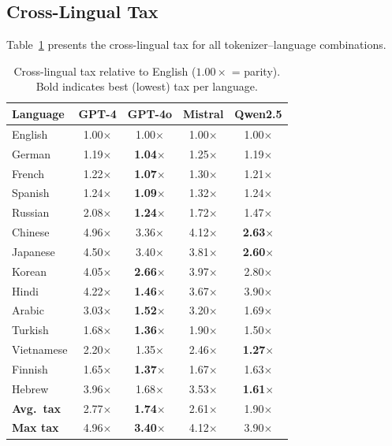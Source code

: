 \documentclass[11pt]{article}
\begin{document}
\subsection{Cross-Lingual Tax}

Table~\ref{tab:tax} presents the cross-lingual tax for all tokenizer--language combinations.

\begin{table}[h]
\centering
\small
\caption{Cross-lingual tax relative to English ($1.00\times$ = parity). Bold indicates best (lowest) tax per language.}
\label{tab:tax}
\begin{tabular}{lcccc}
\toprule
\textbf{Language} & \textbf{GPT-4} & \textbf{GPT-4o} & \textbf{Mistral} & \textbf{Qwen2.5} \\
\midrule
English   & 1.00$\times$ & 1.00$\times$ & 1.00$\times$ & 1.00$\times$ \\
German    & 1.19$\times$ & \textbf{1.04$\times$} & 1.25$\times$ & 1.19$\times$ \\
French    & 1.22$\times$ & \textbf{1.07$\times$} & 1.30$\times$ & 1.21$\times$ \\
Spanish   & 1.24$\times$ & \textbf{1.09$\times$} & 1.32$\times$ & 1.24$\times$ \\
Russian   & 2.08$\times$ & \textbf{1.24$\times$} & 1.72$\times$ & 1.47$\times$ \\
Chinese   & 4.96$\times$ & 3.36$\times$ & 4.12$\times$ & \textbf{2.63$\times$} \\
Japanese  & 4.50$\times$ & 3.40$\times$ & 3.81$\times$ & \textbf{2.60$\times$} \\
Korean    & 4.05$\times$ & \textbf{2.66$\times$} & 3.97$\times$ & 2.80$\times$ \\
Hindi     & 4.22$\times$ & \textbf{1.46$\times$} & 3.67$\times$ & 3.90$\times$ \\
Arabic    & 3.03$\times$ & \textbf{1.52$\times$} & 3.20$\times$ & 1.69$\times$ \\
Turkish   & 1.68$\times$ & \textbf{1.36$\times$} & 1.90$\times$ & 1.50$\times$ \\
Vietnamese& 2.20$\times$ & 1.35$\times$ & 2.46$\times$ & \textbf{1.27$\times$} \\
Finnish   & 1.65$\times$ & \textbf{1.37$\times$} & 1.67$\times$ & 1.63$\times$ \\
Hebrew    & 3.96$\times$ & 1.68$\times$ & 3.53$\times$ & \textbf{1.61$\times$} \\
\midrule
\textbf{Avg.\ tax} & 2.77$\times$ & \textbf{1.74$\times$} & 2.61$\times$ & 1.90$\times$ \\
\textbf{Max tax}   & 4.96$\times$ & \textbf{3.40$\times$} & 4.12$\times$ & 3.90$\times$ \\
\bottomrule
\end{tabular}
\end{table}
\end{document}
